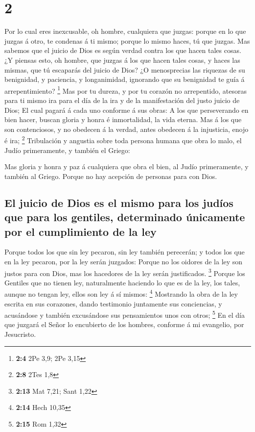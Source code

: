 \hypertarget{section-1}{%
\section{2}\label{section-1}}

 Por lo cual eres inexcusable, oh hombre, cualquiera que
juzgas: porque en lo que juzgas á otro, te condenas á ti mismo; porque
lo mismo haces, tú que juzgas.  Mas sabemos que el juicio de
Dios es según verdad contra los que hacen tales cosas.  ¿Y
piensas esto, oh hombre, que juzgas á los que hacen tales cosas, y haces
las mismas, que tú escaparás del juicio de Dios?  ¿O
menosprecias las riquezas de su benignidad, y paciencia, y longanimidad,
ignorando que su benignidad te guía á arrepentimiento? \footnote{\textbf{2:4}
  2Pe 3,9; 2Pe 3,15}  Mas por tu dureza, y por tu corazón no
arrepentido, atesoras para ti mismo ira para el día de la ira y de la
manifestación del justo juicio de Dios;  El cual pagará á
cada uno conforme á sus obras:  A los que perseverando en
bien hacer, buscan gloria y honra é inmortalidad, la vida eterna.
 Mas á los que son contenciosos, y no obedecen á la verdad,
antes obedecen á la injusticia, enojo é ira; \footnote{\textbf{2:8} 2Tes
  1,8}  Tribulación y angustia sobre toda persona humana que
obra lo malo, el Judío primeramente, y también el Griego:

 Mas gloria y honra y paz á cualquiera que obra el bien, al
Judío primeramente, y también al Griego.  Porque no hay
acepción de personas para con Dios.

\hypertarget{el-juicio-de-dios-es-el-mismo-para-los-juduxedos-que-para-los-gentiles-determinado-uxfanicamente-por-el-cumplimiento-de-la-ley}{%
\subsection{El juicio de Dios es el mismo para los judíos que para los
gentiles, determinado únicamente por el cumplimiento de la
ley}\label{el-juicio-de-dios-es-el-mismo-para-los-juduxedos-que-para-los-gentiles-determinado-uxfanicamente-por-el-cumplimiento-de-la-ley}}

 Porque todos los que sin ley pecaron, sin ley también
perecerán; y todos los que en la ley pecaron, por la ley serán juzgados:
 Porque no los oidores de la ley son justos para con Dios,
mas los hacedores de la ley serán justificados. \footnote{\textbf{2:13}
  Mat 7,21; Sant 1,22}  Porque los Gentiles que no tienen
ley, naturalmente haciendo lo que es de la ley, los tales, aunque no
tengan ley, ellos son ley á sí mismos: \footnote{\textbf{2:14} Hech
  10,35}  Mostrando la obra de la ley escrita en sus
corazones, dando testimonio juntamente sus conciencias, y acusándose y
también excusándose sus pensamientos unos con otros; \footnote{\textbf{2:15}
  Rom 1,32}  En el día que juzgará el Señor lo encubierto
de los hombres, conforme á mi evangelio, por Jesucristo.

